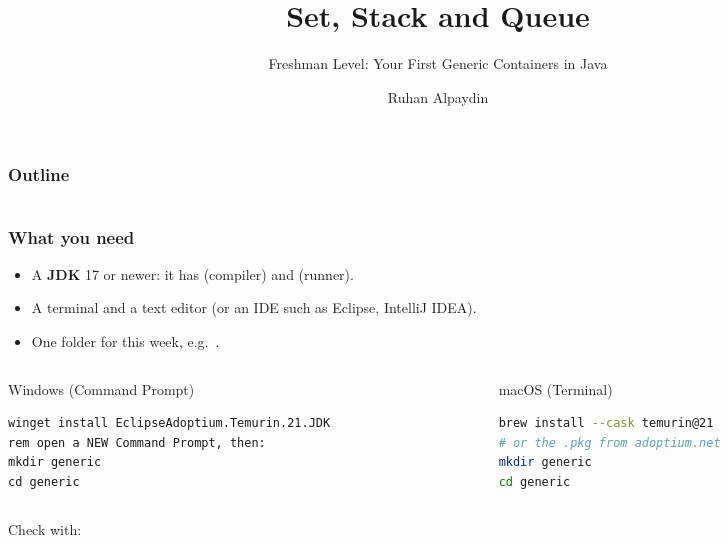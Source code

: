 \documentclass[aspectratio=169,10pt,compress]{beamer}
\title{Set, Stack and Queue}
\subtitle{Freshman Level: Your First Generic Containers in Java}
\author[Alpaydin]{Ruhan Alpaydin}
\institute[FCIS]{
    Faculty of Computer and Information Sciences\\
    Yeditepe University
}
\date{
	{\tiny \hbTimeStamp}
}
\begin{document}
\begin{frame}[t,fragile]
  \titlepage
\end{frame}




\begin{frame}[t,fragile] \frametitle{Outline}
  \begin{columns}[T]
    \begin{column}{0.48\textwidth}
      \tableofcontents[sections={1-3}, hideallsubsections]
    \end{column}
    \begin{column}{0.48\textwidth}
      \tableofcontents[sections={4-5}, hideallsubsections]
    \end{column}
  \end{columns}
\end{frame}





\begin{frame}[t,fragile] \frametitle{What you need}
  \begin{itemize}
    \item A \textbf{JDK} 17 or newer: it has  (compiler) and  (runner).
    \item A terminal and a text editor (or an IDE such as Eclipse, IntelliJ IDEA).
    \item One folder for this week, e.g.\ .
  \end{itemize}
  \begin{columns}[T]
    \begin{column}{0.48\textwidth}
      \begin{block}{Windows (Command Prompt)}
\begin{lstlisting}[style=codesnippet, language={}, basicstyle=\ttfamily\scriptsize]
winget install EclipseAdoptium.Temurin.21.JDK
rem open a NEW Command Prompt, then:
mkdir generic
cd generic
\end{lstlisting}
      \end{block}
    \end{column}
    \begin{column}{0.48\textwidth}
      \begin{block}{macOS (Terminal)}
\begin{lstlisting}[style=codesnippet, language=bash, basicstyle=\ttfamily\scriptsize]
brew install --cask temurin@21
# or the .pkg from adoptium.net
mkdir generic
cd generic
\end{lstlisting}
      \end{block}
    \end{column}
  \end{columns}
  \small Check with:
\end{frame}
\end{document}
